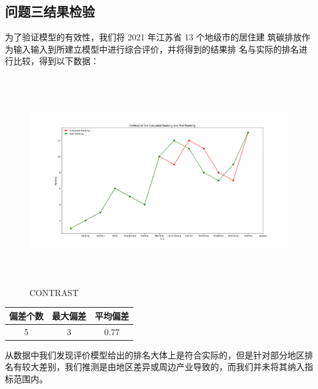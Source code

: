 \documentclass[a4paper, 12pt]{article}
\numberwithin{equation}{section}
\begin{document}
        \subsection{问题三结果检验}
            为了验证模型的有效性，我们将 2021 年江苏省 13 个地级市的居住建
            筑碳排放作为输入输入到所建立模型中进行综合评价，并将得到的结果排
            名与实际的排名进行比较，得到以下数据：\\
            \begin{figure}[h]
                \centering
                \includegraphics[height=9cm,width=15cm]{contrast_q3.png}
                \caption{CONTRAST}
            \end{figure}
            \begin{table}[h]
                \centering
                \begin{tabular}{c c c} \hline
                    偏差个数 & 最大偏差 & 平均偏差 \\ \hline
                    5 & 3 & 0.77 \\ \hline
                \end{tabular}
            \end{table}
            从数据中我们发现评价模型给出的排名大体上是符合实际的，但是针对部分地区排名有较大差别，我们推测是由地区差异或周边产业导致的，而我们并未将其纳入指标范围内。
\end{document}
